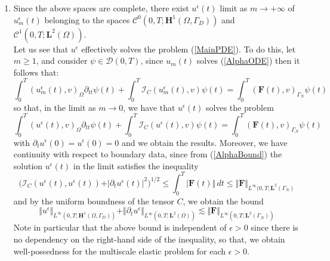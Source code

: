 \begin{enumerate}
    
    \item Since the above spaces are complete, there exist $u^{\epsilon}(t)$ limit as $m \longrightarrow +\infty$ of $u^{\epsilon}_m(t)$ belonging to the spaces $\mathcal{C}^0(0,T; \mathbf{H}^1(\Omega, \Gamma_D))$ and $\mathcal{C}^1(0,T; \mathbf{L}^2(\Omega))$.\\
    Let us see that $u^{\epsilon}$ effectively solves the problem (\ref{MainPDE}). To do this, let $m \geq 1$, and consider $\psi \in \mathcal{D}(0,T)$, since $u_m(t)$ solves (\ref{AlphaODE}) then it follows that:
    \begin{equation*}
        \int_0^T (u_m^{\epsilon}(t),v)_{\Omega} \partial_{tt}\psi(t) + \int_0^T \mathcal{I}_C (u_m^{\epsilon}(t),v) \psi(t)  = \int_0^T (\mathbf{F}(t),v)_{\Gamma_N} \psi(t) 
    \end{equation*}
    so that, in the limit as $m \longrightarrow 0$, we have that $u^{\epsilon}(t)$ solves the problem
    \begin{equation*}
        \int_0^T (u^{\epsilon}(t),v)_{\Omega} \partial_{tt}\psi(t) + \int_0^T \mathcal{I}_C (u^{\epsilon}(t),v) \psi(t) = \int_0^T (\mathbf{F}(t),v)_{\Gamma_N}\psi(t) 
    \end{equation*}
    with $\partial_t u^{\epsilon}(0) = u^{\epsilon}(0) = 0$ and we obtain the results. Moreover, we have continuity with respect to boundary data, since from (\ref{AlphaBound}) the solution $u^{\epsilon}(t)$ in the limit satisfies the inequality 
    \begin{equation*}
        \big( \mathcal{I}_C(u^{\epsilon}(t), u^{\epsilon}(t))+ \vert \partial_t u^{\epsilon}(t) \vert^2 \big)^{1/2} \leq \int_0^T \vert \mathbf{F}(t) \Vert \, dt \leq \Vert \mathbf{F}\Vert_{L^{\infty}(0,T;\mathbf{L}^2(\Gamma_N)}
    \end{equation*}
    and by the uniform boundness of the tensor $C$, we obtain the bound
    \begin{equation*}
        \Vert u^{\epsilon} \Vert_{L^{\infty}(0,T;\mathbf{H}^1(\Omega, \Gamma_D))}  + \Vert \partial_t u^{\epsilon} \Vert_{L^{\infty}(0,T;\mathbf{L}^2(\Omega))} \lesssim \Vert \mathbf{F}\Vert_{L^{\infty}(0,T; \mathbf{L}^2(\Gamma_N))}
    \end{equation*}
    Note in particular that the above bound is independent of $\epsilon > 0$ since there is no dependency on the right-hand side of the inequality, so that, we obtain well-possedness for the multiscale elastic problem for each $\epsilon > 0$.
\end{enumerate}

